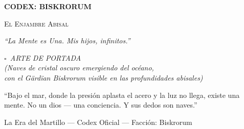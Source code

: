
\begin{titlepage}
    \centering
    \vspace*{1cm}

    \noindent\makebox[\linewidth]{\rule{\textwidth}{3pt}}
    \vspace{0.2cm}
    \noindent\makebox[\linewidth]{\rule{\textwidth}{0.5pt}}
    \vspace{0.6cm}

    {\fontsize{36}{42}\selectfont \bfseries \color{VoidPurple} CODEX: BISKRORUM \par}
    \vspace{0.2cm}
    {\Large \scshape\color{BloodPurple} El Enjambre Abisal \par}
    \vspace{0.2cm}
    {\large \color{ChromeGray} \itshape ``La Mente es Una. Mis hijos, infinitos.'' \par}
    \vspace{0.5cm}

    \noindent\makebox[\linewidth]{\rule{\textwidth}{0.5pt}}
    \vspace{0.2cm}
    \noindent\makebox[\linewidth]{\rule{\textwidth}{3pt}}

    \vspace{1.2cm}

    \begin{tcolorbox}[
        enhanced,
        colback=VoidBlack!95,
        colframe=GoldRule,
        width=0.85\textwidth,
        height=9cm,
        halign=center,
        valign=center,
        arc=0mm
    ]
        {\color{GoldRule} \fontsize{10}{12}\selectfont \itshape
        $\square$\ ARTE DE PORTADA \\[6pt]
        \small (Naves de cristal oscuro emergiendo del océano,\\
        con el Gärdïan Biskrorum visible en las profundidades abisales)
        }
    \end{tcolorbox}

    \vspace{0.8cm}

    \begin{loreblock}
        \centering
        ``Bajo el mar, donde la presión aplasta el acero y la luz no llega, existe una mente. No un dios — una conciencia. Y sus dedos son naves.''
    \end{loreblock}

    \vfill
    {\small \color{ChromeGray} La Era del Martillo — Codex Oficial — Facción: Biskrorum}
\end{titlepage}

